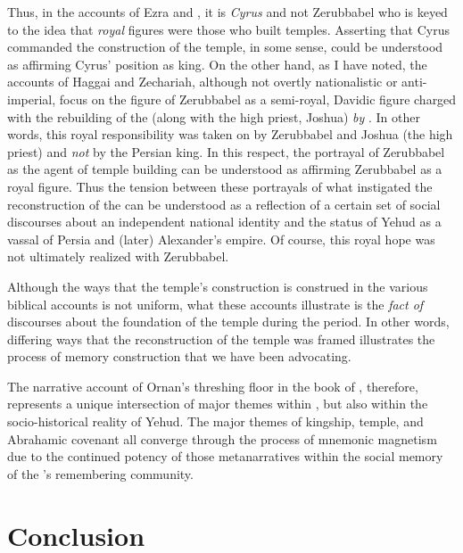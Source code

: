 Thus, in the accounts of Ezra and \chronicler, it is \emph{Cyrus} and not Zerubbabel who is keyed to the idea that \emph{royal} figures were those who built temples. Asserting that Cyrus commanded the construction of the temple, in some sense, could be understood as affirming Cyrus' position as king. On the other hand, as I have noted, the accounts of Haggai and Zechariah, although not overtly nationalistic or anti-imperial, focus on the figure of Zerubbabel as a semi-royal, Davidic figure charged with the rebuilding of the \temple (along with the high priest, Joshua) \emph{by \yahweh}. In other words, this royal responsibility was taken on by Zerubbabel and Joshua (the high priest) and \emph{not} by the Persian king. In this respect, the portrayal of Zerubbabel as the agent of temple building can be understood as affirming Zerubbabel as a royal figure. Thus the tension between these portrayals of what instigated the reconstruction of the \temple can be understood as a reflection of a certain set of social discourses about an independent national identity and the status of Yehud as a vassal of Persia and (later) Alexander's empire. Of course, this royal hope was not ultimately realized with Zerubbabel.

Although the ways that the temple's construction is construed in the various biblical accounts is not uniform, what these accounts illustrate is the \emph{fact of} discourses about the foundation of the temple during the \secondtemple period. In other words, differing ways that the reconstruction of the temple was framed illustrates the process of memory construction that we have been advocating.

The narrative account of Ornan's threshing floor in the book of \chronicles, therefore, represents a unique intersection of major themes within \chronicles, but also within the socio-historical reality of \secondtemple Yehud. The major themes of kingship, temple, and Abrahamic covenant all converge through the process of mnemonic magnetism due to the continued potency of those metanarratives within the social memory of the \chronicler's remembering community.

\section{Conclusion}

